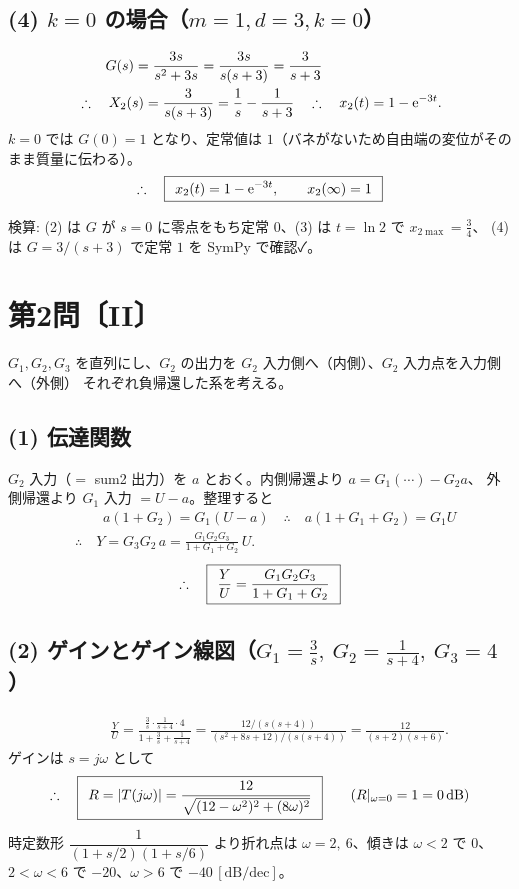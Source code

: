 \documentclass[11pt,a4paper]{article}
\begin{document}
\subsection*{(4) $k=0$ の場合（$m=1,d=3,k=0$）}
\begin{align*}
  &\qquad G(s)=\frac{3s}{s^2+3s}=\frac{3s}{s(s+3)}=\frac{3}{s+3}\\
  &\therefore\quad X_2(s)=\frac{3}{s(s+3)}=\frac1s-\frac{1}{s+3}
   \quad\therefore\quad x_2(t)=1-\mathrm{e}^{-3t}.
\end{align*}
$k=0$ では $G(0)=1$ となり、定常値は $1$（バネがないため自由端の変位がそのまま質量に伝わる）。
\[
  \therefore\quad \boxed{\,\;x_2(t)=1-\mathrm{e}^{-3t},\qquad x_2(\infty)=1\;\,}
\]

\bigskip
\noindent 検算: (2) は $G$ が $s=0$ に零点をもち定常 $0$、(3) は $t=\ln2$ で $x_{2\max}=\tfrac34$、
(4) は $G=3/(s+3)$ で定常 $1$ を SymPy で確認✓。

\newpage
\section*{第2問〔II〕}

$G_1,G_2,G_3$ を直列にし、$G_2$ の出力を $G_2$ 入力側へ（内側）、$G_2$ 入力点を入力側へ（外側）
それぞれ負帰還した系を考える。

\subsection*{(1) 伝達関数}
$G_2$ 入力（$=$ sum2 出力）を $a$ とおく。内側帰還より $a=G_1(\cdots)-G_2 a$、
外側帰還より $G_1$ 入力 $=U-a$。整理すると
\begin{align*}
  &\qquad a(1+G_2)=G_1(U-a)
   \quad\therefore\quad a(1+G_1+G_2)=G_1 U\\
  &\therefore\quad Y=G_3 G_2\,a=\frac{G_1G_2G_3}{1+G_1+G_2}\,U.
\end{align*}
\[
  \therefore\quad \boxed{\,\;\dfrac{Y}{U}=\dfrac{G_1G_2G_3}{1+G_1+G_2}\;\,}
\]

\subsection*{(2) ゲインとゲイン線図（$G_1=\frac3s,\ G_2=\frac{1}{s+4},\ G_3=4$）}
\begin{align*}
  &\qquad \frac{Y}{U}=\frac{\frac3s\cdot\frac{1}{s+4}\cdot4}{1+\frac3s+\frac{1}{s+4}}
   =\frac{12/(s(s+4))}{(s^2+8s+12)/(s(s+4))}
   =\frac{12}{(s+2)(s+6)}.
\end{align*}
ゲインは $s=j\omega$ として
\[
  \therefore\quad \boxed{\,\;R=|T(j\omega)|=\dfrac{12}{\sqrt{(12-\omega^2)^2+(8\omega)^2}}\;\,}\qquad(R|_{\omega=0}=1=0\,\mathrm{dB})
\]
時定数形 $\dfrac{1}{(1+s/2)(1+s/6)}$ より折れ点は $\omega=2,\ 6$、傾きは $\omega<2$ で $0$、
$2<\omega<6$ で $-20$、$\omega>6$ で $-40\,[\mathrm{dB/dec}]$。
\end{document}
